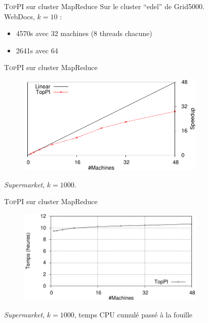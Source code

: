 \documentclass[table]{beamer}
\providecommand{\toppi}{\mbox{\textsc{TopPI}}}
\begin{document}
\begin{frame}{{\toppi} sur cluster MapReduce}
  Sur le cluster ``edel'' de Grid5000.\\\vspace{1em}
  WebDocs, $k=10$ :
  \begin{itemize}
    \item 4570s avec 32 machines (8 threads chacune)
    \item 2641s avec 64
  \end{itemize}
\end{frame}

\begin{frame}{{\toppi} sur cluster MapReduce}
  \begin{figure}
  	\centering
  	\includegraphics[width=0.8\textwidth]{../fig/toppi/hadoop-speedup/supermarket-s2-k1000-t8.pdf}
  \end{figure}
  \textit{Supermarket}, $k=1000$.
\end{frame}

\begin{frame}{{\toppi} sur cluster MapReduce}
  \begin{figure}
  	\centering
  	\includegraphics[width=0.8\textwidth]{../fig/toppi/hadoop-speedup/supermarket-s2-k1000-t8-cumulatedMiningTime.pdf}
  \end{figure}
  \textit{Supermarket}, $k=1000$, temps CPU cumulé passé à la fouille
\end{frame}
\end{document}
